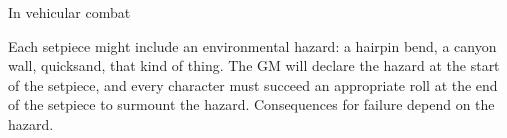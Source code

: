 
In vehicular combat

Each setpiece might include an environmental hazard: a hairpin bend, a canyon wall, quicksand, that kind of thing. The GM will declare the hazard at the start of the setpiece, and every character must succeed an appropriate roll at the end of the setpiece to surmount the hazard. Consequences for failure depend on the hazard.
